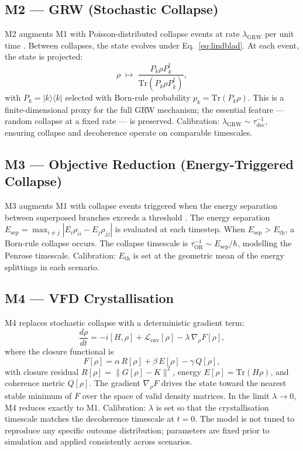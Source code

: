 \documentclass[12pt]{article}
\begin{document}
\subsection{M2 --- GRW (Stochastic Collapse)}

M2 augments M1 with Poisson-distributed collapse events at rate $\lambda_{\mathrm{GRW}}$ per unit time \citep{GRW1986}. Between collapses, the state evolves under Eq.~\eqref{eq:lindblad}. At each event, the state is projected:
\begin{equation}
\rho \;\mapsto\; \frac{P_k \rho P_k^\dagger}{\mathrm{Tr}(P_k \rho P_k^\dagger)},
\end{equation}
with $P_k = |k\rangle\langle k|$ selected with Born-rule probability $p_k = \mathrm{Tr}(P_k \rho)$. This is a finite-dimensional proxy for the full GRW mechanism; the essential feature --- random collapse at a fixed rate --- is preserved. Calibration: $\lambda_{\mathrm{GRW}} \sim \tau_{\mathrm{dec}}^{-1}$, ensuring collapse and decoherence operate on comparable timescales.

\subsection{M3 --- Objective Reduction (Energy-Triggered Collapse)}

M3 augments M1 with collapse events triggered when the energy separation between superposed branches exceeds a threshold \citep{Penrose1996}. The energy separation $E_{\mathrm{sep}} = \max_{i \neq j} |E_i \rho_{ii} - E_j \rho_{jj}|$ is evaluated at each timestep. When $E_{\mathrm{sep}} > E_{\mathrm{th}}$, a Born-rule collapse occurs. The collapse timescale is $\tau_{\mathrm{OR}}^{-1} \sim E_{\mathrm{sep}} / \hbar$, modelling the Penrose timescale. Calibration: $E_{\mathrm{th}}$ is set at the geometric mean of the energy splittings in each scenario.

\subsection{M4 --- VFD Crystallisation}

M4 replaces stochastic collapse with a deterministic gradient term:
\begin{equation}\label{eq:crystal}
\frac{d\rho}{dt} = -i[H, \rho] + \mathcal{L}_{\mathrm{env}}[\rho] - \lambda\, \nabla_\rho F[\rho],
\end{equation}
where the closure functional is
\begin{equation}\label{eq:closure}
F[\rho] = \alpha\, R[\rho] + \beta\, E[\rho] - \gamma\, Q[\rho],
\end{equation}
with closure residual $R[\rho] = \|G[\rho] - K\|^2$, energy $E[\rho] = \mathrm{Tr}(H\rho)$, and coherence metric $Q[\rho]$. The gradient $\nabla_\rho F$ drives the state toward the nearest stable minimum of $F$ over the space of valid density matrices. In the limit $\lambda \to 0$, M4 reduces exactly to M1. Calibration: $\lambda$ is set so that the crystallisation timescale matches the decoherence timescale at $t = 0$. The model is not tuned to reproduce any specific outcome distribution; parameters are fixed prior to simulation and applied consistently across scenarios.
\end{document}
